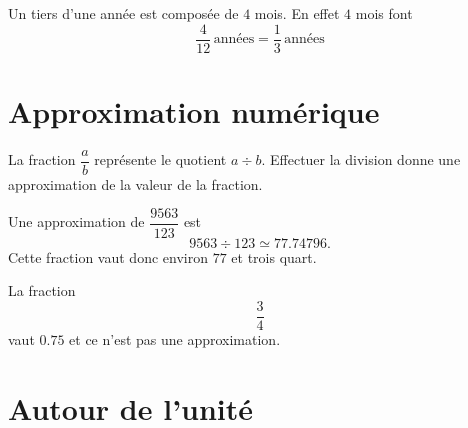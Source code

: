 \begin{example}
    Un tiers d'une année est composée de \( 4\) mois. En effet \( 4\) mois font
    \begin{equation}
        \frac{ 4 }{ 12 }\,\text{années}=\frac{ 1 }{ 3 }\,\text{années}
    \end{equation}
\end{example}

\section{Approximation numérique}

\begin{Aretenir}
    La fraction \( \dfrac{ a }{ b }\) représente le quotient \( a\div b\). Effectuer la division donne une approximation de la valeur de la fraction.
\end{Aretenir}

\begin{example}
    Une approximation de \( \dfrac{ 9563 }{ 123 }\) est
    \begin{equation}
     9563\div 123\simeq 77.74796.
    \end{equation}
    Cette fraction vaut donc environ \( 77\) et trois quart.
\end{example}

\begin{example}
    La fraction
    \begin{equation}
        \frac{ 3 }{ 4 }
    \end{equation}
    vaut \( 0.75\) et ce n'est pas une approximation.
\end{example}

\section{Autour de l'unité}

